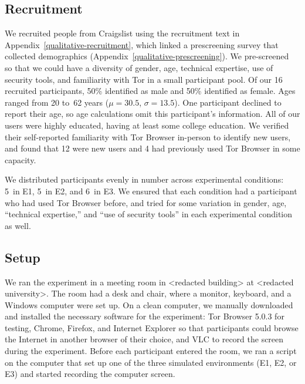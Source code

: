 \documentclass[USenglish,oneside,twocolumn]{article}
\begin{document}
\subsection{Recruitment}
We recruited people from Craigslist using the recruitment text in Appendix~\ref{qualitative-recruitment}, which linked a prescreening survey that collected demographics (Appendix~\ref{qualitative-prescreening}). We pre-screened~\cite{screening} so that we could have a diversity of gender, age, technical expertise, use of security tools, and familiarity with Tor in a small participant pool. Of our 16 recruited participants, 50\% identified as male and 50\% identified as female. Ages ranged from 20 to~62 years ($\mu = 30.5$, $\sigma = 13.5$). One participant declined to report their age, so age calculations omit this participant's information. All of our users were highly educated, having at least some college education. We verified their self-reported familiarity with Tor Browser in-person to identify new users, and found that 12 were new users and 4 had previously used Tor Browser in some capacity.  



We distributed participants evenly in number across experimental conditions:  5~in E1, 5~in E2, and 6~in E3. We ensured that each condition had a participant who had used Tor Browser before, and tried for some variation in gender, age, ``technical expertise,'' and ``use of security tools'' in each experimental condition as well. 

\subsection{Setup} 
We ran the experiment in a meeting room in <redacted building> at <redacted university>. The room had a desk and chair, where a monitor, keyboard, and a Windows computer were set up. On a clean computer, we manually downloaded and installed the necessary software for the experiment: Tor Browser 5.0.3 for testing, Chrome, Firefox, and Internet Explorer so that participants could browse the Internet in another browser of their choice, and VLC to record the screen during the experiment. Before each participant entered the room, we ran a script on the computer that
set up one of the three simulated environments (E1, E2, or E3) and started recording the computer screen.  
\end{document}

